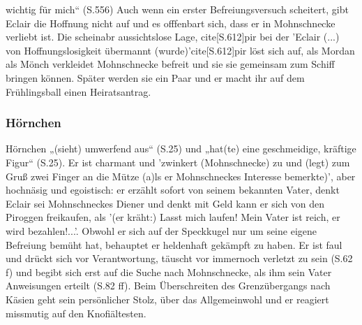 {wichtig für mich“ (S.556) Auch wenn ein erster Befreiungsversuch scheitert, gibt Eclair die Hoffnung nicht auf und es offfenbart sich, dass er in Mohnschnecke verliebt ist. \cite[S.603]{pir} Die scheinabr aussichtslose Lage, cite[S.612]{pir} bei der 'Eclair (...) von Hoffnungslosigkeit übermannt (wurde)'cite[S.612]{pir} löst sich auf, als Mordan als Mönch verkleidet Mohnschnecke befreit und sie sie gemeinsam zum Schiff bringen können.\cite[S.614]{pir} Später werden sie ein Paar \cite[S.631ff]{pir} und er macht ihr auf dem Frühlingsball einen Heiratsantrag.\cite[S.640ff]{pir }

\subsubsection{Hörnchen}

Hörnchen „(sieht) umwerfend aus“ (S.25) und „hat(te) eine geschmeidige, kräftige Figur“ (S.25). Er ist charmant und 'zwinkert (Mohnschnecke) zu und (legt) zum Gruß zwei Finger an die Mütze (a)ls er Mohnschneckes Interesse bemerkte)'\cite[S.25]{pir}, aber hochnäsig und egoistisch: er erzählt sofort von seinem bekannten Vater\cite[S.25]{pir}, denkt Eclair sei Mohnschneckes Diener\cite[S.26]{pir} und denkt mit Geld kann er sich von den Piroggen freikaufen, als '(er kräht:) Lasst mich laufen! Mein Vater ist reich, er wird bezahlen!...'.\cite[S.34]{pir} Obwohl er sich auf der Speckkugel nur um seine eigene Befreiung bemüht hat, behauptet er heldenhaft gekämpft zu haben.\cite[S.40]{pir} Er ist faul und drückt sich vor Verantwortung, täuscht vor immernoch verletzt zu sein (S.62 f) und begibt sich erst auf die Suche nach Mohnschnecke, als ihm sein Vater Anweisungen erteilt (S.82 ff). Beim Überschreiten des Grenzübergangs nach Käsien geht sein persönlicher Stolz, über das Allgemeinwohl und er reagiert missmutig auf den Knofiältesten.\cite[S.142f]{pir}
}
